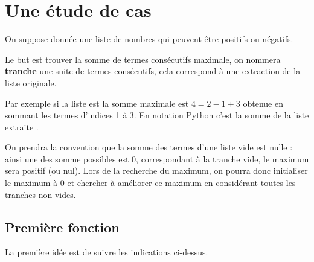 \section{Une étude de cas}
On suppose donnée une liste de nombres qui peuvent être positifs ou négatifs.

Le but est trouver la somme de termes consécutifs maximale, on nommera {\bf tranche} une suite de termes consécutifs, cela correspond à une extraction  de la liste originale.

Par exemple si la liste est  la somme maximale est $4 = 2 -1 +3$ obtenue en sommant les termes d'indices 1 à 3. En notation Python c'est la somme de la liste extraite .

On prendra la convention que la somme des termes d'une liste vide est nulle : ainsi une des somme possibles est 0, correspondant à la tranche vide, le maximum sera positif (ou nul). Lors de la recherche du maximum, on pourra donc initialiser le maximum à 0 et chercher à améliorer ce maximum en considérant toutes les tranches non vides.
\newpage
\subsection{Première fonction}
La première idée est de suivre les indications ci-dessus.

